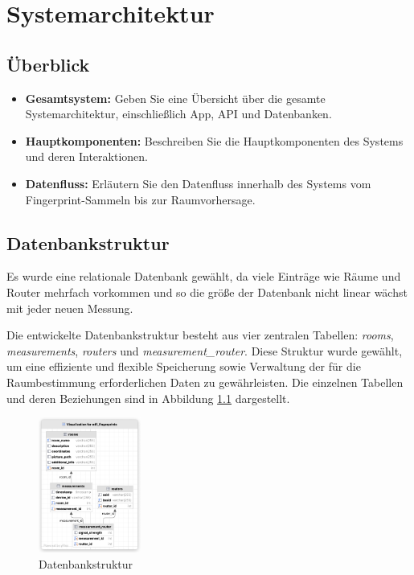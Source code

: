 \chapter{Systemarchitektur}

\section{Überblick}
\begin{itemize}
    \item \textbf{Gesamtsystem:} Geben Sie eine Übersicht über die gesamte Systemarchitektur, einschließlich App, API und Datenbanken.
    \item \textbf{Hauptkomponenten:} Beschreiben Sie die Hauptkomponenten des Systems und deren Interaktionen.
    \item \textbf{Datenfluss:} Erläutern Sie den Datenfluss innerhalb des Systems vom Fingerprint-Sammeln bis zur Raumvorhersage.
\end{itemize}

\section{Datenbankstruktur}

Es wurde eine relationale Datenbank gewählt, da viele Einträge wie Räume und Router mehrfach vorkommen und so die größe der Datenbank nicht linear wächst mit jeder neuen Messung.

Die entwickelte Datenbankstruktur besteht aus vier zentralen Tabellen: \textit{rooms}, \textit{measurements}, \textit{routers} und \textit{measurement\_router}. Diese Struktur wurde gewählt, um eine effiziente und flexible Speicherung sowie Verwaltung der für die Raumbestimmung erforderlichen Daten zu gewährleisten. Die einzelnen Tabellen und deren Beziehungen sind in Abbildung \ref{fig:database-structure} dargestellt.

\begin{figure}[h]
    \centering
    \includegraphics[width=0.3\textwidth]{images/database_strucure.png}
    \caption{Datenbankstruktur}
    \label{fig:database-structure}
\end{figure}


